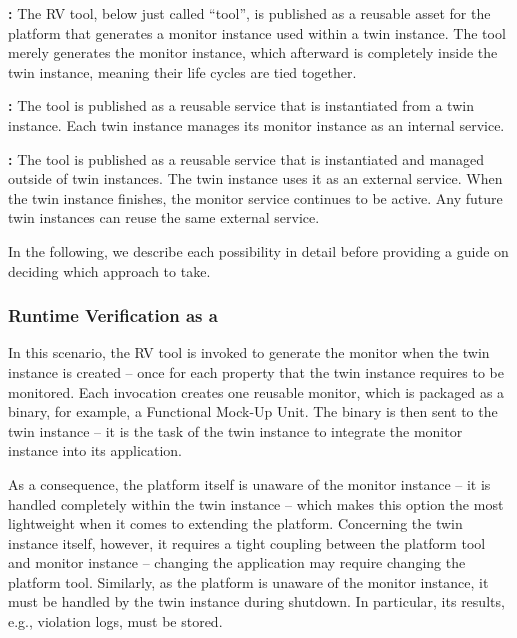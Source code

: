 \textbf{\methodone:} The RV tool, below just called ``tool'', is published as a reusable asset for the platform that generates a monitor instance used within a twin instance.		The tool merely generates the monitor instance, which afterward is completely inside the twin instance, meaning their life cycles are tied together.

\textbf{\methodtwo:} The tool is published as a reusable service that is instantiated from a twin instance.
Each twin instance manages its monitor instance as an internal service.

\textbf{\methodthree:} The tool is published as a reusable service that is instantiated and managed outside of twin instances.
The twin instance uses it as an external service.
When the twin instance finishes, the monitor service continues to be active. Any future twin instances can reuse the same external service.

In the following, we describe each possibility in detail before providing a guide on deciding which approach to take.

\subsubsection{Runtime Verification as a \methodone}
In this scenario, the RV tool is invoked to generate the monitor when the twin instance is created -- once for each property that the twin instance requires to be monitored.
Each invocation creates one reusable monitor, which is packaged as a binary, for example, a Functional Mock-Up Unit.
The binary is then sent to the twin instance -- it is the task of the twin instance to integrate the monitor instance into its application.

As a consequence, the platform itself is unaware of the monitor instance -- it is handled completely within the twin instance -- which makes this option the most lightweight when it comes
to extending the platform. Concerning the twin instance itself, however, it requires a tight coupling between the platform tool and monitor instance --
changing the application may require changing the platform tool.
Similarly, as the platform is unaware of the monitor instance, it must be handled by the twin instance during shutdown.
In particular, its results, e.g., violation logs, must be stored.

